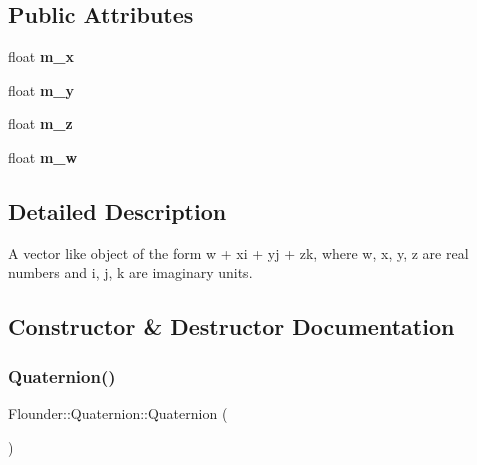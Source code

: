 \subsection*{Public Attributes}
\begin{DoxyCompactItemize}
\item 
\mbox{\label{class_flounder_1_1_quaternion_a1cc7b683eb6757d6c61347aa0e001c27}} 
float {\bfseries m\+\_\+x}
\item 
\mbox{\label{class_flounder_1_1_quaternion_a58d0ed15a62ba6200d99b3bc978b2ea0}} 
float {\bfseries m\+\_\+y}
\item 
\mbox{\label{class_flounder_1_1_quaternion_aeca473e92fd47ac2e3c8f450cadbaf0a}} 
float {\bfseries m\+\_\+z}
\item 
\mbox{\label{class_flounder_1_1_quaternion_a465b608190cff6d4a49abe08beefb59a}} 
float {\bfseries m\+\_\+w}
\end{DoxyCompactItemize}


\subsection{Detailed Description}
A vector like object of the form w + xi + yj + zk, where w, x, y, z are real numbers and i, j, k are imaginary units. 



\subsection{Constructor \& Destructor Documentation}
\mbox{\label{class_flounder_1_1_quaternion_ad46c815a079376f4916f4d129309f4ce}} 
\subsubsection{\texorpdfstring{Quaternion()}{Quaternion()}\hspace{0.1cm}{\footnotesize\ttfamily [1/4]}}
{\footnotesize\ttfamily Flounder\+::\+Quaternion\+::\+Quaternion (\begin{DoxyParamCaption}{ }\end{DoxyParamCaption})}



